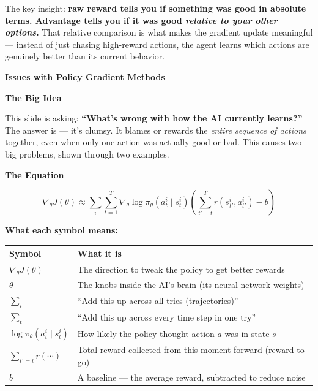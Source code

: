 The key insight: \textbf{raw reward tells you if something was good in absolute terms. Advantage tells you if it was good \textit{relative to your other options}.} That relative comparison is what makes the gradient update meaningful --- instead of just chasing high-reward actions, the agent learns which actions are genuinely better than its current behavior.

\bigskip


\textbf{Issues with Policy Gradient Methods}

\medskip

\textbf{The Big Idea}

This slide is asking: \textbf{``What's wrong with how the AI currently learns?''} The answer is --- it's clumsy. It blames or rewards the \textit{entire sequence of actions} together, even when only one action was actually good or bad. This causes two big problems, shown through two examples.

\medskip

\textbf{The Equation}

\[
\nabla_\theta J(\theta) \approx \sum_i \sum_{t=1}^{T} \nabla_\theta \log\pi_\theta(a_t^i \mid s_t^i)
\left( \sum_{t'=t}^{T} r(s_{t'}^i, a_{t'}^i) - b \right)
\]

\textbf{What each symbol means:}

\begin{center}
\begin{tabular}{ll}
\hline
Symbol & What it is \\
\hline
$\nabla_\theta J(\theta)$ & The direction to tweak the policy to get better rewards \\
$\theta$ & The knobs inside the AI's brain (its neural network weights) \\
$\sum_i$ & ``Add this up across all tries (trajectories)'' \\
$\sum_t$ & ``Add this up across every time step in one try'' \\
$\log\pi_\theta(a_t^i \mid s_t^i)$ & How likely the policy thought action $a$ was in state $s$ \\
$\sum_{t'=t} r(\cdots)$ & Total reward collected from this moment forward (reward to go) \\
$b$ & A baseline --- the average reward, subtracted to reduce noise \\
\hline
\end{tabular}
\end{center}

